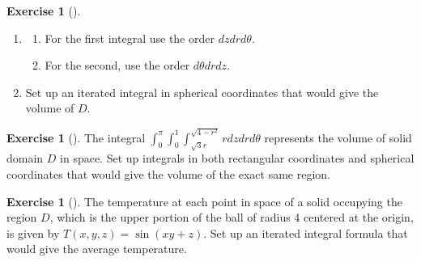 \documentclass[10pt,]{book}
\theoremstyle{plain}
\theoremstyle{definition}
\theoremstyle{definition}
\theoremstyle{definition}
\theoremstyle{definition}
\newtheorem{exploration}[project]{Exercise}
\theoremstyle{definition}
\numberwithin{equation}{section}
\newcommand{\ds}{\displaystyle}
\begin{document}
\begin{exploration}[]\label{exploration-307}
\leavevmode%
\begin{enumerate}[font=\bfseries,label=(\alph*),ref=\alph*]
\item\label{task-835} \begin{enumerate}[font=\bfseries,label=(\roman*),ref=\theenumi.\roman*]
\item\label{task-836} For the first integral use the order \(dzdrd\theta\).%
\item\label{task-837} For the second, use the order \(d\theta dr dz\).%
\end{enumerate}
\item\label{task-838} Set up an iterated integral in spherical coordinates that would give the volume of \(D\).%
\end{enumerate}
\end{exploration}
\begin{exploration}[]\label{exploration-308}
The integral \(\ds\int_{0}^{\pi}\int_{0}^{1}\int_{\sqrt{3}r}^{\sqrt{4-r^2}}rdzdrd\theta\) represents the volume of solid domain \(D\) in space. Set up integrals in both rectangular coordinates and spherical coordinates that would give the volume of the exact same region.%
\end{exploration}
\begin{exploration}[]\label{exploration-309}
The temperature at each point in space of a solid occupying the region {\(D\)}, which is the upper portion of the ball of radius 4 centered at the origin, is given by \(T(x,y,z) = \sin(xy+z)\). Set up an iterated integral formula that would give the average temperature.%
\end{exploration}
\typeout{************************************************}
\typeout{************************************************}
\end{document}
